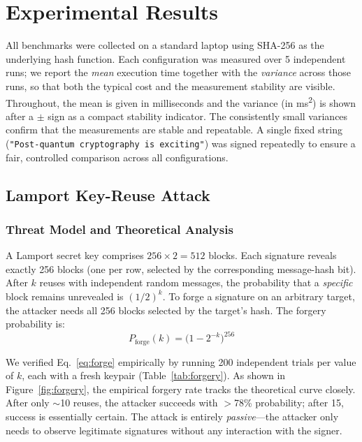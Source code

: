 \documentclass[10pt,a4paper,twocolumn]{article}
\begin{document}
\section{Experimental Results}\label{sec:experiments}

All benchmarks were collected on a standard laptop using SHA-256 as the underlying hash function. Each configuration was measured over 5 independent runs; we report the \emph{mean} execution time together with the \emph{variance} across those runs, so that both the typical cost and the measurement stability are visible. Throughout, the mean is given in milliseconds and the variance (in ms\textsuperscript{2}) is shown after a $\pm$ sign as a compact stability indicator. The consistently small variances confirm that the measurements are stable and repeatable. A single fixed string (\texttt{"Post-quantum cryptography is exciting"}) was signed repeatedly to ensure a fair, controlled comparison across all configurations.

\subsection{Lamport Key-Reuse Attack}

\subsubsection{Threat Model and Theoretical Analysis}

A Lamport secret key comprises $256 \times 2 = 512$ blocks. Each signature reveals exactly 256 blocks (one per row, selected by the corresponding message-hash bit). After $k$ reuses with independent random messages, the probability that a \emph{specific} block remains unrevealed is $(1/2)^k$. To forge a signature on an arbitrary target, the attacker needs all 256 blocks selected by the target's hash. The forgery probability is:
\begin{equation}
    P_{\text{forge}}(k) = \bigl(1 - 2^{-k}\bigr)^{256}
    \label{eq:forge}
\end{equation}

We verified Eq.~\eqref{eq:forge} empirically by running 200 independent trials per value of $k$, each with a fresh keypair (Table~\ref{tab:forgery}). As shown in Figure~\ref{fig:forgery}, the empirical forgery rate tracks the theoretical curve closely. After only $\sim$10 reuses, the attacker succeeds with $>$78\% probability; after 15, success is essentially certain. The attack is entirely \emph{passive}---the attacker only needs to observe legitimate signatures without any interaction with the signer.
\end{document}
